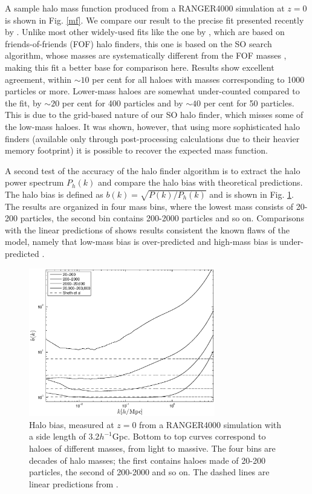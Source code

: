 A sample halo mass function produced  from a RANGER4000 simulation at $z=0$ is shown in Fig. \ref{mf}. We compare our result to the 
precise fit presented recently by \citet{2008ApJ...688..709T}. Unlike most
other widely-used fits like the one by \citet{2002MNRAS.329...61S}, which are based on friends-of-friends (FOF)
halo finders, this one is based on the
SO search algorithm, whose masses are systematically different 
from the FOF masses \citep[e.g.][]{2007MNRAS.374....2R,2008ApJ...688..709T}, 
making this fit a better base for comparison here. Results show excellent
agreement, within $\sim10$ per cent for all haloes with masses corresponding to
1000 particles or more. Lower-mass haloes are somewhat under-counted compared
to the \citet{2008ApJ...688..709T} fit, by $\sim20$ per cent for 400 particles and 
by $\sim40$ per cent for 50 particles. This is due to the grid-based nature of our
SO halo finder, which misses some of the low-mass haloes. It was shown, however, that using more sophisticated
halo finders (available only through post-processing calculations due to their heavier memory
footprint) it is possible to recover the expected mass function.

A second test of the accuracy of the halo finder algorithm is to extract the halo power spectrum $P_{h}(k)$ and compare the halo bias
with theoretical predictions. The halo bias is defined as $b(k) = \sqrt{P(k)/P_{h}(k)}$ and is shown in Fig. \ref{fig:halo}.
The results are organized in four mass bins, where the lowest mass consists of 20-200 particles, the second bin 
contains 200-2000 particles and so on. Comparisons with the linear predictions of \citet{2001MNRAS.323....1S} shows
results consistent the known flaws of the model, namely that low-mass bias is over-predicted and high-mass bias is under-predicted \citep{2010ApJ...724..878T}.

\begin{figure}%
  \begin{center}
    \includegraphics[width=3.2in]{graphs/bias.eps}
  \end{center}
  \caption{Halo bias, measured at $z=0$ from a RANGER4000 simulation with a side length of $3.2 h^{-1}$Gpc.
  Bottom to top curves correspond to haloes of different masses, from light to massive. The four bins are decades
  of halo masses; the first contains haloes made of 20-200 particles, the second of 200-2000 and so on.
  The dashed lines are linear predictions from \protect \citet{2001MNRAS.323....1S}.
    \label{fig:halo}}
\end{figure}


